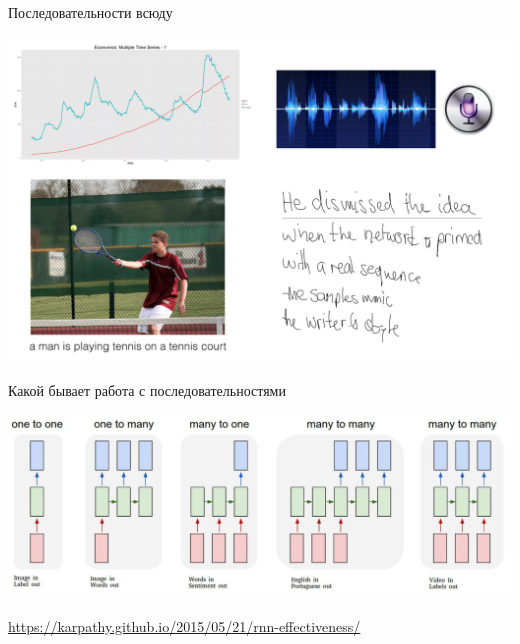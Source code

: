 \documentclass[notes,12pt, aspectratio=169]{beamer}
\begin{document}
\begin{frame}{Последовательности всюду}
\begin{center}
	\includegraphics[width=.8\linewidth]{posled.png}
\end{center}
\end{frame}


\begin{frame}{Какой бывает работа с последовательностями}
\begin{center}
	\includegraphics[width=.99\linewidth]{rnn_variants.png}
\end{center}

\vfill 
\footnotesize 
\color{blue} \url{https://karpathy.github.io/2015/05/21/rnn-effectiveness/} 
\end{frame}
\end{document}
